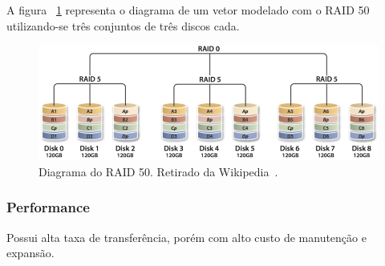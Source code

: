 		A figura ~\ref{fig:raid50} representa o diagrama de um vetor modelado com o RAID 50 utilizando-se três conjuntos de três discos cada.\\
		
		\begin{figure}[htb]
			\begin{center}
				
				\includegraphics[clip,width=15.0cm]{images/RAID_50.png}
				\caption{Diagrama do RAID 50. Retirado da Wikipedia~\citep{wikiRAIDlevels}.}
				\label{fig:raid50}
			\end{center}
		\end{figure} 
		
		\subsubsection{Performance}
		Possui alta taxa de transferência, porém com alto custo de manutenção e expansão.
		
		



 

	

